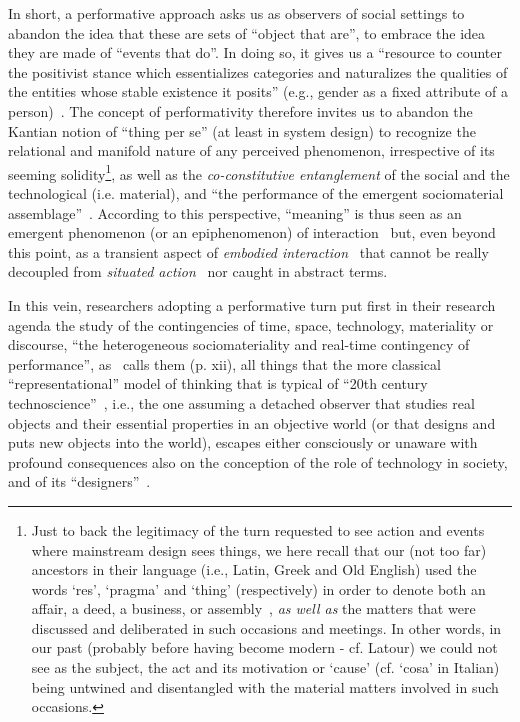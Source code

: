 \documentclass{article}
\begin{document}
In short, a performative approach asks us as observers of social settings to abandon the idea that these are sets of ``object that are'', to embrace the idea they are made of ``events that do''. In doing so, it gives us a ``resource to counter the positivist stance which essentializes categories and naturalizes the qualities of the entities whose stable existence it posits'' (e.g., gender as a fixed attribute of a person)~\citep{licoppe_performative_2010}. The concept of performativity therefore invites us to abandon the Kantian notion of ``thing per se'' (at least in system design) to recognize the relational and manifold nature of any perceived phenomenon, irrespective of its seeming solidity\footnote{Just to back the legitimacy of the turn requested to see action and events where mainstream design sees things, we here recall that our (not too far) ancestors in their language (i.e., Latin, Greek and Old English) used the words `res', `pragma' and `thing' (respectively) in order to denote both an affair, a deed, a business, or assembly~\citep[p. 1]{telier_design_2011}, \emph{as well as} the matters that were discussed and deliberated in such occasions and meetings. In other words, in our past (probably before having become modern - cf. Latour) we could not see as the subject, the act and its motivation or `cause' (cf. `cosa' in Italian) being untwined and disentangled with the material matters involved in such occasions.}, as well as  the \emph{co-constitutive entanglement} of the social and the technological (i.e. material), and ``the performance of the emergent sociomaterial assemblage''~\citep{orlikowski_sociomaterial_2007}. According to this perspective, ``meaning'' is thus seen as an emergent phenomenon (or an epiphenomenon) of interaction~\citep{hug_performativity_2010} but, even beyond this point, as a transient aspect of \emph{embodied interaction}~\citep{dourish_where_2001} that cannot be really decoupled from \emph{situated action}~\citep{suchman_human-machine_2006} nor caught in abstract terms. 


In this vein, researchers adopting a performative turn put first in their research agenda the study of the contingencies of time, space, technology, materiality or discourse, ``the heterogeneous sociomateriality and real-time contingency of performance'', as~\citet{suchman_human-machine_2006} calls them (p. xii), all things that the more classical ``representational'' model of thinking that is typical of ``20th century technoscience''~\citep{suchman_figuring_2004}, i.e., the one assuming a detached observer that studies real objects and their essential properties in an objective world (or that designs and puts new objects into the world), escapes either consciously or unaware with profound consequences also on the conception of the role of technology in society, and of its ``designers''~\citep{orlikowski_sociomaterial_2007}.
\end{document}
